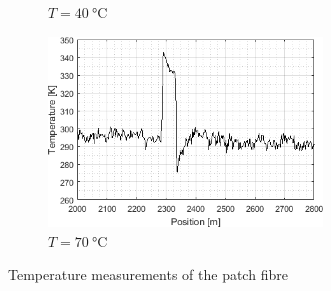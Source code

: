 \documentclass{standalone}
\begin{document}
\begin{landscape}
\begin{figure}[h]
\begin{subfigure}[b]{0.49\linewidth}
			\caption{$T = \SI{40}{\celsius}$}
		\end{subfigure}
		\begin{subfigure}[b]{0.49\linewidth}
			\centering
			\includegraphics[width=0.8\textwidth]{final_measurements_70c.png}
			\caption{$T = \SI{70}{\celsius}$}
		\end{subfigure}
		\caption{Temperature measurements of the patch fibre}
		\label{fig:final_measurements}
	\end{figure}
\end{landscape}

\setcounter{page}{\thepage-1}


\setcounter{stranica}{\thepage}
\addtocounter{stranica}{1}
\end{document}
